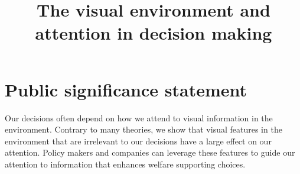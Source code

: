 \documentclass[english,natbib,man,floatsintext,mask]{apa6}
\title{The visual environment and attention in decision making}
\begin{document}



\linenumbers
\maketitle

\section{\normalfont\normalsize Public significance statement}
\noindent Our decisions often depend on how we attend to visual information in the environment. Contrary to many theories, we show that visual features in the environment that are irrelevant to our decisions have a large effect on our attention. Policy makers and companies can leverage these features to guide our attention to information that enhances welfare supporting choices.\par
\newpage













\clearpage



\appendix

\end{document}

